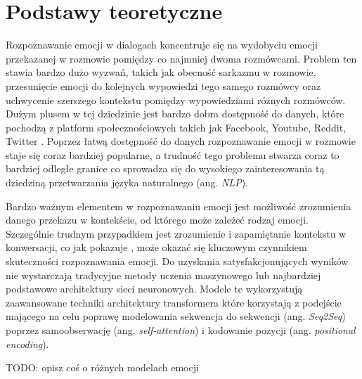 \chapter{Podstawy teoretyczne}

Rozpoznawanie emocji w dialogach koncentruje się na wydobyciu emocji przekazanej w rozmowie pomiędzy co najmniej dwoma rozmówcami. Problem ten stawia bardzo dużo wyzwań, takich jak obecność sarkazmu w rozmowie, przesunięcie emocji do kolejnych wypowiedzi tego samego rozmówcy oraz uchwycenie szerszego kontekstu pomiędzy wypowiedziami różnych rozmówców. Dużym plusem w tej dziedzinie jest bardzo dobra dostępność do danych, które pochodzą z platform społecznościowych takich jak Facebook, Youtube, Reddit, Twitter \cite{poria2019emotion}. Poprzez łatwą dostępność do danych rozpoznawanie emocji w rozmowie staje się coraz bardziej popularne, a trudność tego problemu stwarza coraz to bardziej odległe granice co sprowadza się do wysokiego zainteresowania tą dziedziną przetwarzania języka naturalnego (ang. \textit{NLP}).

Bardzo ważnym elementem w rozpoznawaniu emocji jest możliwość zrozumienia danego przekazu w kontekście, od którego może zależeć rodzaj emocji. Szczególnie trudnym przypadkiem jest zrozumienie i zapamiętanie kontekstu w konwersacji, co jak pokazuje \cite{zhong2019knowledgeenriched}, może okazać się kluczowym czynnikiem skuteczności rozpoznawania emocji. Do uzyskania satysfakcjonujących wyników nie wystarczają tradycyjne metody uczenia maszynowego lub najbardziej podstawowe architektury sieci neuronowych. Modele te wykorzystują zaawansowane techniki architektury transformera \cite{vaswani2017attention} które korzystają z podejście mającego na celu poprawę modelowania sekwencja do sekwencji (ang. \textit{Seq2Seq}) poprzez samoobserwację (ang. \textit{self-attention}) i kodowanie pozycji (ang. \textit{positional encoding}).

TODO: opisz coś o różnych modelach emocji

\cite{howard2018universal}

\cite{devlin2018bert}

\cite{brochier2019global}
